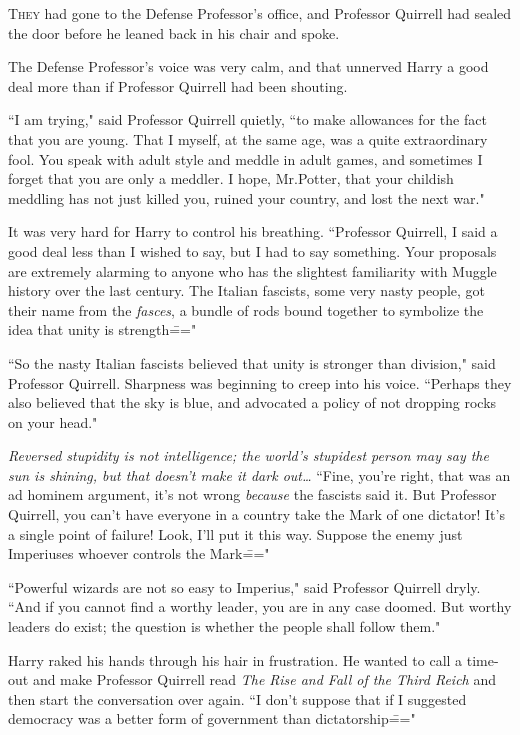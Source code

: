 
\lettrine{T}{hey} had gone to the Defense Professor's office, and Professor Quirrell had sealed the door before he leaned back in his chair and spoke.

The Defense Professor's voice was very calm, and that unnerved Harry a good deal more than if Professor Quirrell had been shouting.

``I am trying," said Professor Quirrell quietly, ``to make allowances for the fact that you are young. That I myself, at the same age, was a quite extraordinary fool. You speak with adult style and meddle in adult games, and sometimes I forget that you are only a meddler. I hope, Mr.\?Potter, that your childish meddling has not just killed you, ruined your country, and lost the next war."

It was very hard for Harry to control his breathing. ``Professor Quirrell, I said a good deal less than I wished to say, but I had to say something. Your proposals are extremely alarming to anyone who has the slightest familiarity with Muggle history over the last century. The Italian fascists, some very nasty people, got their name from the \emph{fasces}, a bundle of rods bound together to symbolize the idea that unity is strength\==="

``So the nasty Italian fascists believed that unity is stronger than division," said Professor Quirrell. Sharpness was beginning to creep into his voice. ``Perhaps they also believed that the sky is blue, and advocated a policy of not dropping rocks on your head."

\emph{Reversed stupidity is not intelligence; the world's stupidest person may say the sun is shining, but that doesn't make it dark out{\ldots}} ``Fine, you're right, that was an ad hominem argument, it's not wrong \emph{because} the fascists said it. But Professor Quirrell, you can't have everyone in a country take the Mark of one dictator! It's a single point of failure! Look, I'll put it this way. Suppose the enemy just Imperiuses whoever controls the Mark\==="

``Powerful wizards are not so easy to Imperius," said Professor Quirrell dryly. ``And if you cannot find a worthy leader, you are in any case doomed. But worthy leaders do exist; the question is whether the people shall follow them."

Harry raked his hands through his hair in frustration. He wanted to call a time-out and make Professor Quirrell read \emph{The Rise and Fall of the Third Reich} and then start the conversation over again. ``I don't suppose that if I suggested democracy was a better form of government than dictatorship\==="

